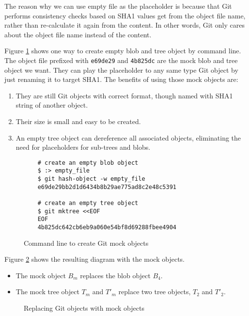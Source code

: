 \documentclass[preprint]{sigplanconf}
\begin{document}
The reason why we can use empty file as the placeholder is because that Git performs consistency checks based on SHA1 values get from the object file name, rather than re-calculate it again from the content. In other words, Git only cares about the object file name instead of the content.

Figure \ref{fig:cmd-create-mock} shows one way to create empty blob and tree object by command line.
The object file prefixed with \verb|e69de29| and \verb|4b825dc| are the mock blob and tree object we want.
They can play the placeholder to any same type Git object by just renaming it to target SHA1.
The benefits of using those mock objects are:
\begin{enumerate}
  \item They are still Git objects with correct format, though named with SHA1 string of another object.
  \item Their size is small and easy to be created.
  \item An empty tree object can dereference all associated objects, eliminating the need for placeholders for sub-trees and blobs.
\end{enumerate}


\begin{figure}[htpb]
  \centering
  \begin{verbatim}
    # create an empty blob object
    $ :> empty_file
    $ git hash-object -w empty_file
    e69de29bb2d1d6434b8b29ae775ad8c2e48c5391

    # create an empty tree object
    $ git mktree <<EOF
    EOF
    4b825dc642cb6eb9a060e54bf8d69288fbee4904
  \end{verbatim}
  \caption{Command line to create Git mock objects}
  \label{fig:cmd-create-mock}
\end{figure}

Figure \ref{fig:mock-objects} shows the resulting diagram with the mock objects.

\begin{itemize}
  \item The mock object $B_m$ replaces the blob object $B_4$.
  \item The mock tree object $T_m$ and $T'_m$ replace two tree objects, $T_2$ and $T'_2$.
\end{itemize}

\begin{figure}[htpb]
  \centering
  
  \caption{Replacing Git objects with mock objects}
  \label{fig:mock-objects}
\end{figure}
\end{document}
